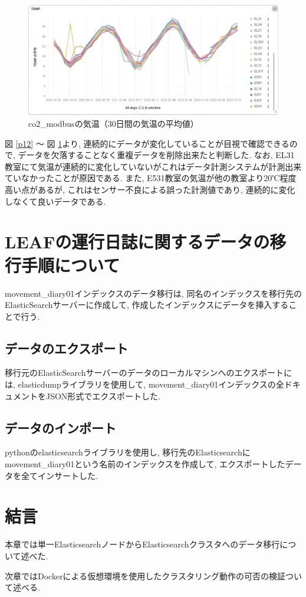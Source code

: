 \begin{figure}[H]
  \begin{center}
    \includegraphics[width=140mm]{sotu/figure/temp.png}
    \caption{co2\_modbusの気温（30日間の気温の平均値）}
    \label{p14}
  \end{center}
\end{figure}

図 \ref{p12} 〜 図 \ref{p14}より, 連続的にデータが変化していることが目視で確認できるので, データを欠落することなく重複データを削除出来たと判断した. なお, EL31教室にて気温が連続的に変化していないがこれはデータ計測システムが計測出来ていなかったことが原因である. また, E531教室の気温が他の教室より20℃程度高い点があるが, これはセンサー不良による誤った計測値であり, 連続的に変化しなくて良いデータである.


\section{LEAFの運行日誌に関するデータの移行手順について}

movement\_diary01インデックスのデータ移行は, 同名のインデックスを移行先のElasticSearchサーバーに作成して, 作成したインデックスにデータを挿入することで行う.

\subsection{データのエクスポート}
移行元のElasticSearchサーバーのデータのローカルマシンへのエクスポートには, elasticdumpライブラリを使用して, movement\_diary01インデックスの全ドキュメントをJSON形式でエクスポートした.

\subsection{データのインポート}
pythonのelasticsearchライブラリを使用し, 移行先のElasticsearchにmovement\_diary01という名前のインデックスを作成して, エクスポートしたデータを全てインサートした.

\section{結言}
本章では単一ElasticsearchノードからElasticsearchクラスタへのデータ移行について述べた.

次章ではDockerによる仮想環境を使用したクラスタリング動作の可否の検証ついて述べる.